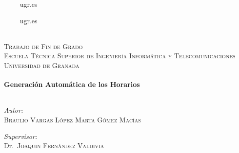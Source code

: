 
\begin{titlepage}

\begin{center}

\begin{minipage}{0.4\textwidth}
\begin{flushright}
$\qquad$
      {ugr.es}\\[1cm]
\end{flushright}
\end{minipage}
\begin{minipage}{0.4\textwidth}
\begin{flushleft}
$\qquad$
      {ugr.es}
\end{flushleft}
\end{minipage}
~\\[1cm]

\textsc{\LARGE Trabajo de Fin de Grado}\\[1.5cm]
\textsc{\Large Escuela Técnica Superior de Ingeniería Informática y Telecomunicaciones}\\[0.5cm]
\textsc{\Large Universidad de Granada}\\[0.5cm]


\HRule \\[0.4cm]
{\huge\bfseries Generación Automática de los Horarios}\\[0.4cm]

\HRule \\[1.5cm]

\begin{minipage}{0.4\textwidth}
\begin{flushleft} \large
\emph{Autor:}\\
\textsc{Braulio Vargas López}
\textsc{Marta Gómez Macías}
\end{flushleft}
\end{minipage}
\begin{minipage}{0.4\textwidth}
\begin{flushright} \large
\emph{Supervisor:} \\
Dr.~\textsc{Joaquín Fernández Valdivia}
\end{flushright}
\end{minipage}


\end{center}
\end{titlepage}
